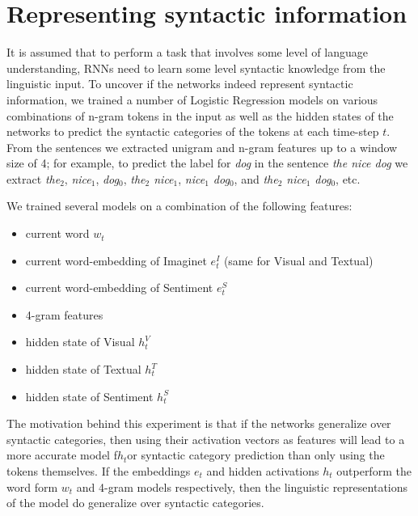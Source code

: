 \section{Representing syntactic information}
\label{sec:regression}

It is assumed that to perform a task that involves some level of language 
understanding, RNNs need to learn some level syntactic knowledge from the 
linguistic input. To uncover if the networks indeed represent syntactic 
information, we trained a number of Logistic Regression models on various 
combinations of n-gram tokens in the input as well as the hidden states of the 
networks to predict the syntactic categories of the tokens at each time-step $t$. 
From the sentences we extracted unigram and n-gram features up to a window 
size of 4; for example, to predict the label for {\it dog} in the sentence {\it the nice 
dog} we extract {\it the}$_2$, {\it nice}$_1$, {\it dog}$_0$, {\it the$_2$ nice$_1$}, 
{\it nice$_1$ dog$_0$}, and {\it the$_2$ nice$_1$ dog$_0$}, etc. 

We trained several models on a combination of the following features:
\begin{itemize}
  \item current word $w_t$
  \item current word-embedding of {\sc Imaginet} $e_t^I$ (same for {\sc Visual} 
and {\sc Textual})
  \item current word-embedding of {\sc Sentiment} $e_t^S$
  \item 4-gram features
  \item hidden state of {\sc Visual} $h_t^V$
  \item hidden state of {\sc Textual} $h_t^T$
  \item hidden state of {\sc Sentiment} $h_t^S$
\end{itemize}

The motivation behind this experiment is that if the networks generalize over 
syntactic categories, then using their activation vectors as features will lead to a 
more accurate model f$h_t$or syntactic category prediction than only using the tokens 
themselves. If the embeddings $e_t$ and hidden activations $h_t$ outperform 
the word form $w_t$ and 4-gram models respectively, then the linguistic 
representations of the model do generalize over syntactic categories.



